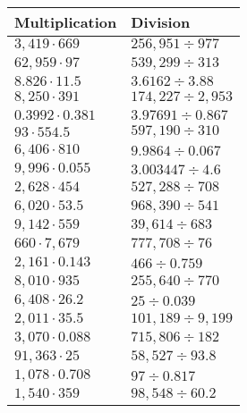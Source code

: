 \begin{longtable}[]{@{}ll@{}}
\toprule
Multiplication & Division\tabularnewline
\midrule
\endhead
\(3,419\cdot669\) & \(256,951÷977\)\tabularnewline
\(62,959\cdot97\) & \(539,299÷313\)\tabularnewline
\(8.826\cdot11.5\) & \(3.6162÷3.88\)\tabularnewline
\(8,250\cdot391\) & \(174,227÷2,953\)\tabularnewline
\(0.3992\cdot0.381\) & \(3.97691÷0.867\)\tabularnewline
\(93\cdot554.5\) & \(597,190÷310\)\tabularnewline
\(6,406\cdot810\) & \(9.9864÷0.067\)\tabularnewline
\(9,996\cdot0.055\) & \(3.003447÷4.6\)\tabularnewline
\(2,628\cdot454\) & \(527,2 8 8÷7 08\)\tabularnewline
\(6,020\cdot53.5\) & \(968,390÷541\)\tabularnewline
\(9,142\cdot559\) & \(39,614÷683\)\tabularnewline
\(660\cdot7,679\) & \(777,708÷76\)\tabularnewline
\(2,161\cdot0.143\) & \(466÷0.759\)\tabularnewline
\(8,010\cdot935\) & \(255,640÷770\)\tabularnewline
\(6,408\cdot26.2\) & \(25÷0.039\)\tabularnewline
\(2,011\cdot35.5\) & \(101,189÷9,199\)\tabularnewline
\(3,070\cdot0.088\) & \(715,806÷182\)\tabularnewline
\(91,363\cdot25\) & \(58,527÷93.8\)\tabularnewline
\(1,078\cdot0.708\) & \(97÷0.817\)\tabularnewline
\(1,540\cdot359\) & \(98,548÷60.2\)\tabularnewline
\bottomrule
\end{longtable}
